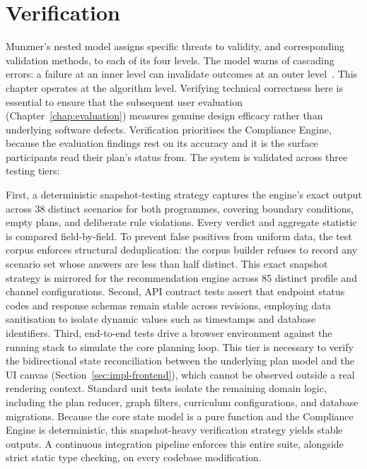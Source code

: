 \section{Verification}
\label{sec:impl-verification}

Munzner's nested model assigns specific threats to validity, and corresponding validation methods, to each of its four levels. The model warns of cascading errors: a failure at an inner level can invalidate outcomes at an outer level~\cite[p.~921]{munzner2009}. This chapter operates at the algorithm level. Verifying technical correctness here is essential to ensure that the subsequent user evaluation (Chapter~\ref{chap:evaluation}) measures genuine design efficacy rather than underlying software defects. Verification prioritises the Compliance Engine, because the evaluation findings rest on its accuracy and it is the surface participants read their plan's status from. The system is validated across three testing tiers:

First, a deterministic snapshot-testing strategy captures the engine's exact output across 38 distinct scenarios for both programmes, covering boundary conditions, empty plans, and deliberate rule violations. Every verdict and aggregate statistic is compared field-by-field. To prevent false positives from uniform data, the test corpus enforces structural deduplication: the corpus builder refuses to record any scenario set whose answers are less than half distinct. This exact snapshot strategy is mirrored for the recommendation engine across 85 distinct profile and channel configurations. 
Second, API contract tests assert that endpoint status codes and response schemas remain stable across revisions, employing data sanitisation to isolate dynamic values such as timestamps and database identifiers. Third, end-to-end tests drive a browser environment against the running stack to simulate the core planning loop. This tier is necessary to verify the bidirectional state reconciliation between the underlying plan model and the UI canvas (Section~\ref{sec:impl-frontend}), which cannot be observed outside a real rendering context. Standard unit tests isolate the remaining domain logic, including the plan reducer, graph filters, curriculum configurations, and database migrations. Because the core state model is a pure function and the Compliance Engine is deterministic, this snapshot-heavy verification strategy yields stable outputs. A continuous integration pipeline enforces this entire suite, alongside strict static type checking, on every codebase modification.

